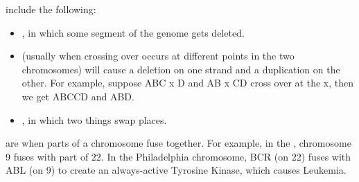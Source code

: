 \begin{exm}
	 include the following:
	\begin{itemize}
		\item {}, in which some segment of the genome gets deleted.
		\item {} (usually when crossing over occurs at different points in the two chromosomes) will cause a deletion on one strand and a duplication on the other. For example, suppose ABC x D and AB x CD cross over at the x, then we get ABCCD and ABD.
		\item {}, in which two things swap places.  
	\end{itemize}
\end{exm}

\begin{exm}
	 are when parts of a chromosome fuse together. For example, in the , chromosome 9 fuses with part of 22.
	In the Philadelphia chromosome, BCR (on 22) fuses with ABL (on 9) to create an always-active Tyrosine Kinase, which causes Leukemia.
\end{exm}
